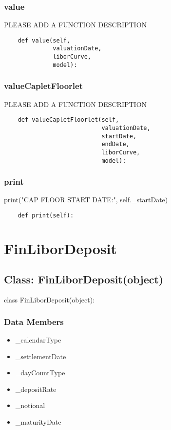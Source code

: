 \documentclass[twoside,11pt]{book}
\begin{document}
\subsubsection*{{\bf value}}
PLEASE ADD A FUNCTION DESCRIPTION

\begin{lstlisting}
    def value(self,
              valuationDate,
              liborCurve,
              model):
\end{lstlisting}

\subsubsection*{{\bf valueCapletFloorlet}}
PLEASE ADD A FUNCTION DESCRIPTION

\begin{lstlisting}
    def valueCapletFloorlet(self,
                            valuationDate,
                            startDate,
                            endDate,
                            liborCurve,
                            model):
\end{lstlisting}

\subsubsection*{{\bf print}}
print("CAP FLOOR START DATE:", self.\_startDate) 

\begin{lstlisting}
    def print(self):
\end{lstlisting}

\newpage
\section{FinLiborDeposit}

\subsection*{Class: FinLiborDeposit(object)}
class FinLiborDeposit(object): 

\subsubsection*{Data Members}
\begin{itemize}
\item{\_calendarType}
\item{\_settlementDate}
\item{\_dayCountType}
\item{\_depositRate}
\item{\_notional}
\item{\_maturityDate}
\end{itemize}
\end{document}
